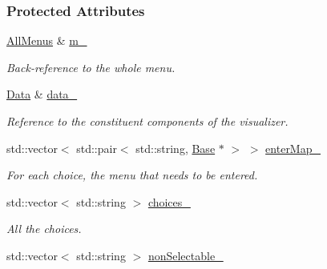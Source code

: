 \subsubsection*{Protected Attributes}
\begin{DoxyCompactItemize}
\item 
\hyperlink{structAllMenus}{All\+Menus} \& \hyperlink{structMenuBase_a42c39b745f2918103120f8e24b9ab045}{m\+\_\+}\hypertarget{structMenuBase_a42c39b745f2918103120f8e24b9ab045}{}\label{structMenuBase_a42c39b745f2918103120f8e24b9ab045}

\begin{DoxyCompactList}\small\item\em Back-\/reference to the whole menu. \end{DoxyCompactList}\item 
\hyperlink{structMenuBase_a473a45fd8adbc75a9220b64753ae3837}{Data} \& \hyperlink{structMenuBase_af32fcbe52f3f72b69519ac45afdff40f}{data\+\_\+}\hypertarget{structMenuBase_af32fcbe52f3f72b69519ac45afdff40f}{}\label{structMenuBase_af32fcbe52f3f72b69519ac45afdff40f}

\begin{DoxyCompactList}\small\item\em Reference to the constituent components of the visualizer. \end{DoxyCompactList}\item 
std\+::vector$<$ std\+::pair$<$ std\+::string, \hyperlink{structMenuBase_a65fa140b1b2ea26bb4de5473b75a502e}{Base} $\ast$ $>$ $>$ \hyperlink{structMenuBase_ae9b5da9e2b53f658e398a1ade0f12966}{enter\+Map\+\_\+}\hypertarget{structMenuBase_ae9b5da9e2b53f658e398a1ade0f12966}{}\label{structMenuBase_ae9b5da9e2b53f658e398a1ade0f12966}

\begin{DoxyCompactList}\small\item\em For each choice, the menu that needs to be entered. \end{DoxyCompactList}\item 
std\+::vector$<$ std\+::string $>$ \hyperlink{structMenuBase_a6b523c65a4ee64bf0f9bd52d723404b0}{choices\+\_\+}\hypertarget{structMenuBase_a6b523c65a4ee64bf0f9bd52d723404b0}{}\label{structMenuBase_a6b523c65a4ee64bf0f9bd52d723404b0}

\begin{DoxyCompactList}\small\item\em All the choices. \end{DoxyCompactList}\item 
std\+::vector$<$ std\+::string $>$ \hyperlink{structMenuBase_a4202aac09948780a585e82351cef2119}{non\+Selectable\+\_\+}\hypertarget{structMenuBase_a4202aac09948780a585e82351cef2119}{}\label{structMenuBase_a4202aac09948780a585e82351cef2119}


\end{DoxyCompactItemize}
